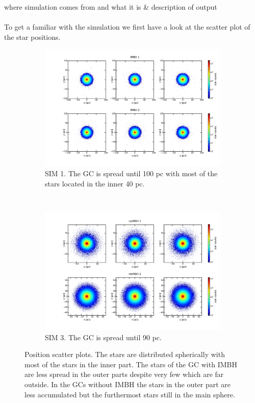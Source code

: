 \color{red}where simulation comes from and what it is \& description of output \color{black}\\
\\
To get a familiar with the simulation we first have a look at the scatter plot of the star positions.
\begin{figure}[htbp] 
\centering
\begin{subfigure}{0.9\textwidth}
	\centering
  	\includegraphics[width=\textwidth]{Plots/position_scatter_plot_IMBH.pdf}
  	\caption{SIM 1. The \ac{GC} is spread until 100 pc with most of the stars located in the inner 40 pc.}
 	\label{fig:pos_scat_IMBH}
\end{subfigure}
\\
\begin{subfigure}{0.9\textwidth}
	\centering
  	\includegraphics[width=\textwidth]{Plots/position_scatter_plot_noIMBH.pdf}
  	\caption{SIM 3. The \ac{GC} is spread until 90 pc.}
 	\label{fig:pos_scat_noIMBH}
\end{subfigure}

\caption{Position scatter plots. The stars are distributed spherically with most of the stars in the inner part. The stars of the \ac{GC} with \ac{IMBH} are less spread in the outer parts despite very few which are far outside. In the \acp{GC} without \ac{IMBH} the stars in the outer part are less accumulated but the furthermost stars still in the main sphere.}
\label{fig:position_scatter}
\end{figure}

